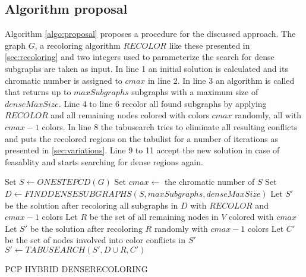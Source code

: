 \subsection{Algorithm proposal}
Algorithm \ref{algo:proposal} proposes a procedure for the discussed approach. The graph $G$, a recoloring algorithm $RECOLOR$ like these presented in \ref{sec:recoloring} and two integers used to parameterize the search for dense subgraphs are taken as input. In line 1 an initial solution is calculated and its chromatic number is assigned to $cmax$ in line 2. In line 3 an algorithm is called that returns up to $maxSubgraphs$ subgraphs with a maximum size of $denseMaxSize$. Line 4 to line 6 recolor all found subgraphs by applying $RECOLOR$ and all remaining nodes colored with colors $cmax$ randomly, all with $cmax-1$ colors. In line 8 the tabusearch tries to eliminate all resulting conflicts and puts the recolored regions on the tabulist for a number of iterations as presented in \ref{sec:variations}. Line 9 to 11 accept the new solution in case of feasablity and starts searching for dense regions again.

\begin{algorithm}
Set $S \gets ONESTEPCD(G)$\;
Set $cmax \gets$ the chromatic number of $S$\;
Set $D \gets FINDDENSESUBGRAPHS( S, maxSubgraphs, denseMaxSize) $\;
Let $S'$ be the solution after recoloring all subgraphs in $D$ with $RECOLOR$ and $cmax-1$ colors\;
Let $R$ be the set of all remaining nodes in $V$ colored with $cmax$\;
Let $S'$ be the solution after recoloring $R$ randomly with $cmax-1$ colors\;
Let $C'$ be the set of nodes involved into color conflicts in $S'$\;
$S' \gets TABUSEARCH(S', D \cup R, C')$\;
\;
\caption{PCP HYBRID DENSERECOLORING}
\label{algo:proposal}
\end{algorithm}




